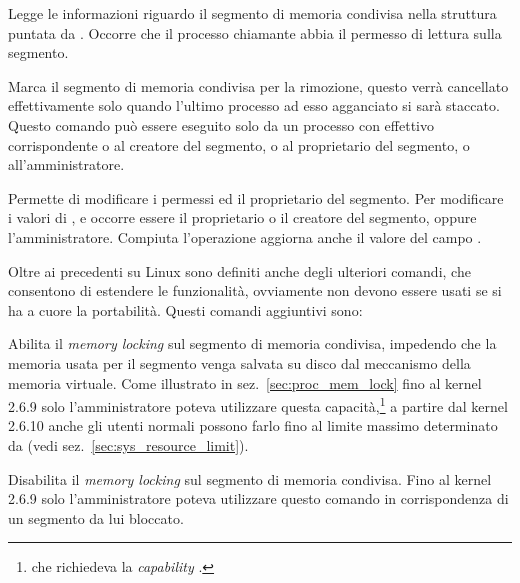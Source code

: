 \begin{basedescript}{\desclabelwidth{2.2cm}\desclabelstyle{\nextlinelabel}}
\item[\const{IPC\_STAT}] Legge le informazioni riguardo il segmento di memoria
  condivisa nella struttura  puntata da . Occorre
  che il processo chiamante abbia il permesso di lettura sulla segmento.
\item[\const{IPC\_RMID}] Marca il segmento di memoria condivisa per la
  rimozione, questo verrà cancellato effettivamente solo quando l'ultimo
  processo ad esso agganciato si sarà staccato. Questo comando può essere
  eseguito solo da un processo con  effettivo corrispondente o al
  creatore del segmento, o al proprietario del segmento, o all'amministratore.
\item[\const{IPC\_SET}] Permette di modificare i permessi ed il proprietario
  del segmento.  Per modificare i valori di ,
   e  occorre essere il proprietario o
  il creatore del segmento, oppure l'amministratore. Compiuta l'operazione
  aggiorna anche il valore del campo .
\end{basedescript}

Oltre ai precedenti su Linux sono definiti anche degli ulteriori comandi, che
consentono di estendere le funzionalità, ovviamente non devono essere usati se
si ha a cuore la portabilità. Questi comandi aggiuntivi sono:

\begin{basedescript}{\desclabelwidth{2.2cm}\desclabelstyle{\nextlinelabel}}
\item[\constd{SHM\_LOCK}] Abilita il \textit{memory locking} sul segmento di
  memoria condivisa, impedendo che la memoria usata per il segmento venga
  salvata su disco dal meccanismo della memoria virtuale. Come illustrato in
  sez.~\ref{sec:proc_mem_lock} fino al kernel 2.6.9 solo l'amministratore
  poteva utilizzare questa capacità,\footnote{che richiedeva la
    \textit{capability} .} a partire dal kernel 2.6.10
  anche gli utenti normali possono farlo fino al limite massimo determinato da
   (vedi sez.~\ref{sec:sys_resource_limit}).
\item[\constd{SHM\_UNLOCK}] Disabilita il \textit{memory locking} sul segmento
  di memoria condivisa.  Fino al kernel 2.6.9 solo l'amministratore poteva
  utilizzare questo comando in corrispondenza di un segmento da lui bloccato.
\end{basedescript}

